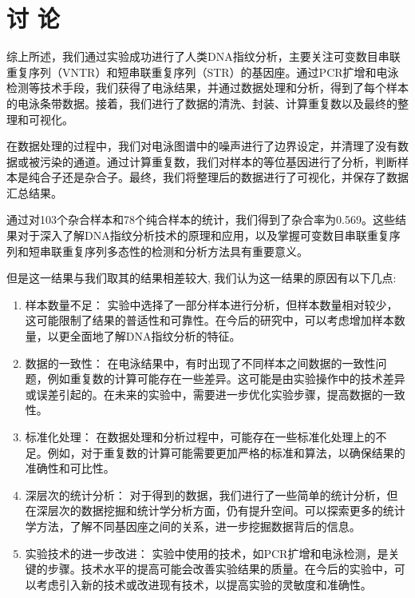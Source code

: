 \documentclass[AutoFakeBold]{LZUThesis}
\begin{document}
\chapter{\texorpdfstring{讨 \quad 论}{讨论}}

综上所述，我们通过实验成功进行了人类DNA指纹分析，主要关注可变数目串联重复序列（VNTR）和短串联重复序列（STR）的基因座。通过PCR扩增和电泳检测等技术手段，我们获得了电泳结果，并通过数据处理和分析，得到了每个样本的电泳条带数据。接着，我们进行了数据的清洗、封装、计算重复数以及最终的整理和可视化。

在数据处理的过程中，我们对电泳图谱中的噪声进行了边界设定，并清理了没有数据或被污染的通道。通过计算重复数，我们对样本的等位基因进行了分析，判断样本是纯合子还是杂合子。最终，我们将整理后的数据进行了可视化，并保存了数据汇总结果。

通过对103个杂合样本和78个纯合样本的统计，我们得到了杂合率为0.569。这些结果对于深入了解DNA指纹分析技术的原理和应用，以及掌握可变数目串联重复序列和短串联重复序列多态性的检测和分析方法具有重要意义。

但是这一结果与我们取其的结果相差较大,
我们认为这一结果的原因有以下几点:

\begin{enumerate}
\item 样本数量不足： 实验中选择了一部分样本进行分析，但样本数量相对较少，这可能限制了结果的普适性和可靠性。在今后的研究中，可以考虑增加样本数量，以更全面地了解DNA指纹分析的特征。

\item 数据的一致性： 在电泳结果中，有时出现了不同样本之间数据的一致性问题，例如重复数的计算可能存在一些差异。这可能是由实验操作中的技术差异或误差引起的。在未来的实验中，需要进一步优化实验步骤，提高数据的一致性。

\item 标准化处理： 在数据处理和分析过程中，可能存在一些标准化处理上的不足。例如，对于重复数的计算可能需要更加严格的标准和算法，以确保结果的准确性和可比性。

\item 深层次的统计分析： 对于得到的数据，我们进行了一些简单的统计分析，但在深层次的数据挖掘和统计学分析方面，仍有提升空间。可以探索更多的统计学方法，了解不同基因座之间的关系，进一步挖掘数据背后的信息。

\item 实验技术的进一步改进： 实验中使用的技术，如PCR扩增和电泳检测，是关键的步骤。技术水平的提高可能会改善实验结果的质量。在今后的实验中，可以考虑引入新的技术或改进现有技术，以提高实验的灵敏度和准确性。
\end{enumerate}
\end{document}
